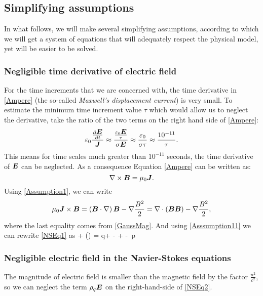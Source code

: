 \subsection{Simplifying assumptions}
In what follows, we will make several simplifying assumptions, according to which we will get a system of equations that will adequately respect the physical model, yet will be easier to be solved.
\subsubsection{Negligible time derivative of electric field}
For the time increments that we are concerned with, the time derivative in \ref{Ampere} (the so-called \textit{Maxwell's displacement current}) is
very small. To estimate the minimum time increment value $\tau$ which would allow us to neglect the derivative, take the ratio of the two terms on the right hand side of \ref{Ampere}:
\begin{equation}
\varepsilon_0 \frac{\frac{\partial{\mbox{\boldmath $E$}}}{\partial{t}}}{\mbox{\boldmath $J$}} \approx \frac{\frac{\varepsilon_0 \mbox{\boldmath $E$}}{\tau}}{\sigma\mbox{\boldmath $E$}} \approx \frac{\varepsilon_0}{\sigma \tau} \approx \frac{10^{-11}}{\tau}.
\end{equation}
This means for time scales much greater than $10^{-11}$ seconds, the time derivative of $\mbox{\boldmath $E$}$ can be neglected. As a consequence Equation \ref{Ampere} can be written as:
\begin{equation}
\label{Assumption1} \nabla \times \mbox{\boldmath $B$} = \mu_0 \mbox{\boldmath $J$}.
\end{equation}
Using \ref{Assumption1}, we can write
\begin{equation}
\label{Asssumption11} \mu_0 \mbox{\boldmath $J$} \times \mbox{\boldmath $B$} = \left(\mbox{\boldmath $B$}\cdot\nabla\right)\mbox{\boldmath $B$} - \nabla\frac{B^2}{2} = \nabla\cdot\left(\mbox{\boldmath $B$}\mbox{\boldmath $B$}\right) - \nabla\frac{B^2}{2},
\end{equation}
where the last equality comes from \ref{GaussMag}. And using \ref{Asssumption11} we can rewrite \ref{NSEq1} as
\be
\label{NSEq2}  + \nabla\cdot\left(\bfpi\otimes\bfu\right) =  q\bfE + \nabla\cdot\lo{}\bfB\bfB - \ro + \rho\bfg - \nabla\,p
\ee

\subsubsection{Negligible electric field in the Navier-Stokes equations}
The magnitude of electric field is smaller than the magnetic field by the factor $\frac{u^2}{c^2}$, so we can neglect the term $\rho_q\mbox{\boldmath $E$}$ on the right-hand-side of \ref{NSEq2}.

